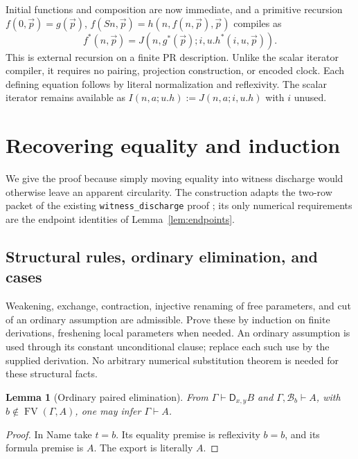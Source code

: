 \documentclass[11pt,letterpaper]{article}
\newtheorem{lemma}[theorem]{Lemma}
\theoremstyle{definition}\newtheorem{definition}[theorem]{Definition}
\theoremstyle{remark}\newtheorem{remark}[theorem]{Remark}
\newcommand{\DD}{\mathsf D}
\newcommand{\FV}{\operatorname{FV}}
\begin{document}
Initial functions and composition are now immediate, and a primitive
recursion $f(0,\vec p)=g(\vec p)$,
$f(Sn,\vec p)=h(n,f(n,\vec p),\vec p)$ compiles as
\[
 f^*(n,\vec p)=J(n,g^*(\vec p);i,u.h^*(i,u,\vec p)).
\]
This is external recursion on a finite PR description. Unlike the scalar
iterator compiler, it requires no pairing, projection construction, or
encoded clock. Each defining equation follows by literal normalization
and reflexivity. The scalar iterator remains available as
$I(n,a;u.h):=J(n,a;i,u.h)$ with $i$ unused.

\section{Recovering equality and induction}\label{sec:equality}

We give the proof because simply moving equality into witness discharge
would otherwise leave an apparent circularity. The construction adapts
the two-row packet of the existing \texttt{witness\_discharge} proof
\cite{witness}; its only numerical requirements are the endpoint identities
of Lemma~\ref{lem:endpoints}.

\subsection{Structural rules, ordinary elimination, and cases}
Weakening, exchange, contraction, injective renaming of free parameters,
and cut of an ordinary assumption are admissible. Prove these by induction
on finite derivations, freshening local parameters when needed. An ordinary
assumption is used through its constant unconditional clause; replace
each such use by the supplied derivation. No arbitrary numerical
substitution theorem is needed for these structural facts.

\begin{lemma}[Ordinary paired elimination]\label{lem:elim}
From $\Gamma\vdash\DD_{x,y}B$ and
$\Gamma,\mathcal B_b\vdash A$, with $b\notin\FV(\Gamma,A)$,
one may infer $\Gamma\vdash A$.
\end{lemma}
\begin{proof}
In Name take $t=b$. Its equality premise is reflexivity $b=b$,
and its formula premise is $A$. The export is literally $A$.
\end{proof}
\end{document}
